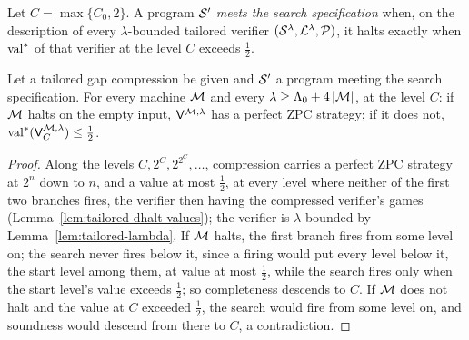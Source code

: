 \begin{definition}
\label{def:tailored-search-spec}
\leanok
Let $C = \max\{C_0, 2\}$. A program $\cal{S}'$ \emph{meets the search specification} when, on the
description of every $\lambda$-bounded tailored verifier $(\cal{S}^\lambda, \cal{L}^\lambda,
\cal{P})$, it halts exactly when $\valstar$ of that verifier at the level $C$ exceeds $\frac12$.
\end{definition}

\begin{theorem}
\label{thm:tailored-halting-level}
\leanok
Let a tailored gap compression be given and $\cal{S}'$ a program meeting the search
specification. For every machine $\machine$ and every $\lambda \geq \Lambda_0 + 4\abs{\machine}$,
at the level $C$: if $\machine$ halts on the empty input, $\verifier^{\machine,\lambda}$ has a
perfect ZPC strategy; if it does not, $\valstar(\verifier^{\machine,\lambda}_C) \leq \frac12$.
\end{theorem}

\begin{proof}
\leanok
Along the levels $C, 2^C, 2^{2^C}, \dots$, compression carries a perfect ZPC strategy at $2^n$
down to $n$, and a value at most $\frac12$, at every level where neither of the first two
branches fires, the verifier then having the compressed verifier's games
(Lemma~\ref{lem:tailored-dhalt-values}); the verifier is $\lambda$-bounded by
Lemma~\ref{lem:tailored-lambda}. If $\machine$ halts, the first branch fires from some level on;
the search never fires below it, since a firing would put every level below it, the start level
among them, at value at most $\frac12$, while the search fires only when the start level's value
exceeds $\frac12$; so completeness descends to $C$. If $\machine$ does not halt and the value at
$C$ exceeded $\frac12$, the search would fire from some level on, and soundness would descend
from there to $C$, a contradiction.
\end{proof}

